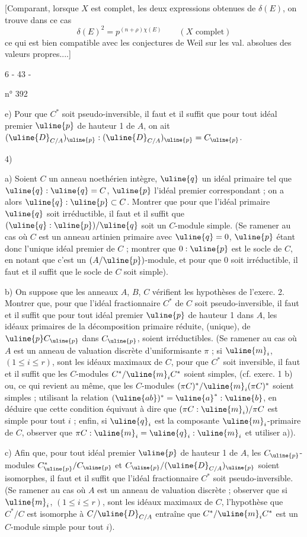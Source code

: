 [Comparant, lorsque $X$ est complet, les deux expressions obtenues de $\delta(E)$, on trouve dans ce cas
\[\delta(E)^2=p^{(n+\rho)\chi(E)}\qquad(X\text{ complet})\]
ce qui est bien compatible avec les conjectures de Weil sur les val. absolues des valeurs propres....]
\begin{center}6 - 43 -\end{center}
\hfill n° 392

e) Pour que $C^*$ soit pseudo-inversible, il faut et il suffit que pour tout idéal premier $\uline{p}$ de hauteur 1 de $A$, on ait $(\uline{D}_{C/A})_{\uline{p}}:(\uline{D}_{C/A})_{\uline{p}}=C_{\uline{p}}$.

4)

a) Soient $C$ un anneau noethérien intègre, $\uline{q}$ un idéal primaire tel que $\uline{q}:\uline{q}=C$, $\uline{p}$ l'idéal premier correspondant ; on a alors $\uline{q}:\uline{p}\subset C$. Montrer que pour que l'idéal primaire $\uline{q}$ soit irréductible, il faut et il suffit que $(\uline{q}:\uline{p})/\uline{q}$ soit un $C$-module simple. (Se ramener au cas où $C$ est un anneau artinien primaire avec $\uline{q}=0$, $\uline{p}$ étant donc l'unique idéal premier de $C$ ; montrer que $0:\uline{p}$ est le socle de $C$, en notant que c'est un $(A/\uline{p})$-module, et pour que 0 soit irréductible, il faut et il suffit que le socle de $C$ soit simple).

b) On suppose que les anneaux $A$, $B$, $C$ vérifient les hypothèses de l'exerc. 2. Montrer que, pour que l'idéal fractionnaire $C^*$ de $C$ soit pseudo-inversible, il faut et il suffit que pour tout idéal premier $\uline{p}$ de hauteur 1 dans $A$, les idéaux primaires de la décomposition primaire réduite, (unique), de $\uline{p}C_{\uline{p}}$ dans $C_{\uline{p}}$, soient irréductibles. (Se ramener au cas où $A$ est un anneau de valuation discrète d'uniformisante $\pi$ ; si $\uline{m}_i$, $(1\leq i\leq r)$, sont les idéaux maximaux de $C$, pour que $C^*$ soit inversible, il faut et il suffit que les $C$-modules $C^*/\uline{m}_iC^*$ soient simples, (cf. exerc. 1 b) ou, ce qui revient au même, que les $C$-modules $(\pi C)^*/\uline{m}_i(\pi C)^*$ soient simples ; utilisant la relation $(\uline{ab})^*=\uline{a}^*:\uline{b}$, en déduire que cette condition équivaut à dire que $(\pi C:\uline{m}_i)/\pi C$ est simple pour tout $i$ ; enfin, si $\uline{q}_i$ est la composante $\uline{m}_i$-primaire de $C$, observer que $\pi C:\uline{m}_i=\uline{q}_i:\uline{m}_i$ et utiliser a)).

c) Afin que, pour tout idéal premier $\uline{p}$ de hauteur 1 de $A$, les $C_{\uline{p}}$-modules $C^*_{\uline{p}}/C_{\uline{p}}$ et $C_{\uline{p}}/(\uline{D}_{C/A})_{\uline{p}}$ soient isomorphes, il faut et il suffit que l'idéal fractionnaire $C^*$ soit pseudo-inversible. (Se ramener au cas où $A$ est un anneau de valuation discrète ; observer que si $\uline{m}_i$, $(1\leq i\leq r)$, sont les idéaux maximaux de $C$, l'hypothèse que $C^*/C$ est isomorphe à $C/\uline{D}_{C/A}$ entraîne que $C^*/\uline{m}_iC^*$ est un $C$-module simple pour tout $i$).

